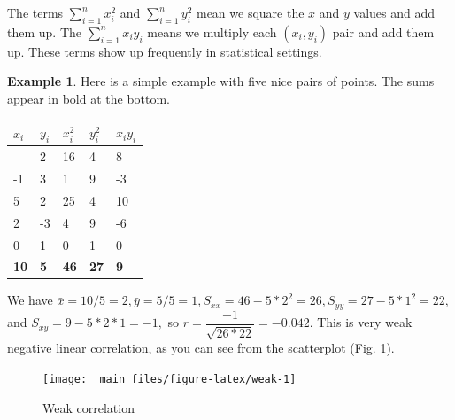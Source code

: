 \documentclass[
]{book}
\theoremstyle{definition}
\theoremstyle{definition}
\newtheorem{example}{Example}[chapter]
\theoremstyle{definition}
\theoremstyle{definition}
\theoremstyle{remark}
\begin{document}
The terms \(\sum_{i=1}^nx_i^2\) and \(\sum_{i=1}^ny_i^2\) mean we square the \(x\) and \(y\) values and add them up. The \(\sum_{i=1}^n x_iy_i\) means we multiply each \((x_i,y_i)\) pair and add them up. These terms show up frequently in statistical settings.

\begin{examplebox}

\begin{example}
Here is a simple example with five nice pairs of points. The sums appear in bold at the bottom.

\begin{longtable}[]{@{}lllll@{}}
\toprule\noalign{}
\(x_i\) & \(y_i\) & \(x_i^2\) & \(y_i^2\) & \(x_i y_i\) \\
\midrule\noalign{}
\endhead
\bottomrule\noalign{}
\endlastfoot
4 & 2 & 16 & 4 & 8 \\
-1 & 3 & 1 & 9 & -3 \\
5 & 2 & 25 & 4 & 10 \\
2 & -3 & 4 & 9 & -6 \\
0 & 1 & 0 & 1 & 0 \\
\textbf{10} & \textbf{5} & \textbf{46} & \textbf{27} & \textbf{9 } \\
\end{longtable}

We have \(\bar{x}=10/5=2,\bar{y}=5/5=1,S_{xx}=46-5*2^2=26, S_{yy}=27-5*1^2=22,\) and \(S_{xy}=9-5*2*1=-1,\) so \(r=\dfrac{-1}{\sqrt{26*22}}=-0.042.\) This is very weak negative linear correlation, as you can see from the scatterplot (Fig. \ref{fig:weak}).
\end{example}

\end{examplebox}

\begin{figure}

{\centering \texttt{[image: \_main\_files/figure-latex/weak-1]} 

}

\caption{Weak correlation}\label{fig:weak}
\end{figure}
\end{document}
